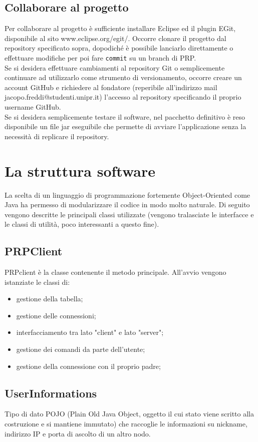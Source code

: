 \documentclass[10pt]{article} %
\begin{document}
\subsection{Collaborare al progetto}
Per collaborare al progetto è sufficiente installare Eclipse ed il plugin EGit, disponibile al sito www.eclipse.org/egit/. Occorre clonare il progetto dal repository specificato sopra, dopodiché è possibile lanciarlo direttamente o effettuare modifiche per poi fare {\tt commit} su un branch di PRP. 
	\\ Se si desidera effettuare cambiamenti al repository Git o semplicemente continuare ad utilizzarlo come strumento di versionamento, occorre creare un account GitHub e richiedere al fondatore (reperibile all'indirizzo mail jacopo.freddi@studenti.unipr.it) l'accesso al repository specificando il proprio username GitHub.
	\\ Se si desidera semplicemente testare il software, nel pacchetto definitivo è reso disponibile un file jar eseguibile che permette di avviare l'applicazione senza la necessità di replicare il repository.


\section{La struttura software}
La scelta di un linguaggio di programmazione fortemente Object-Oriented come Java ha permesso di modularizzare il codice in modo molto naturale. Di seguito vengono descritte le principali classi utilizzate (vengono tralasciate le interfacce e le classi di utilità, poco interessanti a questo fine).
\subsection{PRPClient}
	PRPclient è la classe contenente il metodo principale. All'avvio vengono istanziate le classi di:
	\begin{itemize}
		\item gestione della tabella;
		\item gestione delle connessioni;
		\item interfacciamento tra lato "client" e lato "server";
		\item gestione dei comandi da parte dell'utente;
		\item gestione della connessione con il proprio padre;
	\end{itemize}

\subsection{UserInformations}
	Tipo di dato POJO (Plain Old Java Object, oggetto il cui stato viene scritto alla costruzione e si mantiene immutato) che raccoglie le informazioni su nickname, indirizzo IP e porta di ascolto di un altro nodo.
\end{document}
